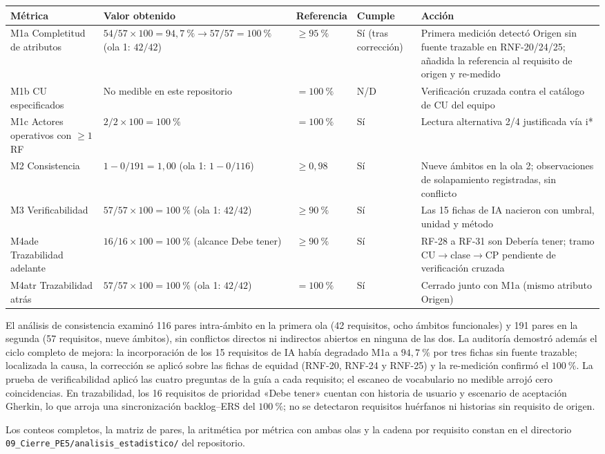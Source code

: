 \begin{center}
\begin{longtable}{|p{3.2cm}|p{2.8cm}|p{2.2cm}|p{1.5cm}|p{4.0cm}|}
\hline
\textbf{Métrica} & \textbf{Valor obtenido} & \textbf{Referencia} & \textbf{Cumple} & \textbf{Acción} \\
\hline
\endfirsthead
\hline
\endhead
M1a Completitud de atributos & $54/57 \times 100 = 94{,}7~\% \rightarrow 57/57 = 100~\%$ (ola 1: $42/42$) & $\geq 95~\%$ & Sí (tras corrección) & Primera medición detectó Origen sin fuente trazable en RNF-20/24/25; añadida la referencia al requisito de origen y re-medido \\
\hline
M1b CU especificados & No medible en este repositorio & $= 100~\%$ & N/D & Verificación cruzada contra el catálogo de CU del equipo \\
\hline
M1c Actores operativos con $\geq 1$ RF & $2/2 \times 100 = 100~\%$ & $= 100~\%$ & Sí & Lectura alternativa 2/4 justificada vía i* \\
\hline
M2 Consistencia & $1 - 0/191 = 1{,}00$ (ola 1: $1 - 0/116$) & $\geq 0{,}98$ & Sí & Nueve ámbitos en la ola 2; observaciones de solapamiento registradas, sin conflicto \\
\hline
M3 Verificabilidad & $57/57 \times 100 = 100~\%$ (ola 1: $42/42$) & $\geq 90~\%$ & Sí & Las 15 fichas de IA nacieron con umbral, unidad y método \\
\hline
M4ade Trazabilidad adelante & $16/16 \times 100 = 100~\%$ (alcance Debe tener) & $\geq 90~\%$ & Sí & RF-28 a RF-31 son Debería tener; tramo CU$\rightarrow$clase$\rightarrow$CP pendiente de verificación cruzada \\
\hline
M4atr Trazabilidad atrás & $57/57 \times 100 = 100~\%$ (ola 1: $42/42$) & $= 100~\%$ & Sí & Cerrado junto con M1a (mismo atributo Origen) \\
\hline
\end{longtable}
\label{tab:auditoria-m1-m4}
\end{center}

El análisis de consistencia examinó 116 pares intra-ámbito en la primera ola
(42 requisitos, ocho ámbitos funcionales) y 191 pares en la segunda (57
requisitos, nueve ámbitos), sin conflictos directos ni indirectos abiertos en
ninguna de las dos. La auditoría demostró además el ciclo completo de mejora:
la incorporación de los 15 requisitos de IA había degradado M1a a $94{,}7~\%$
por tres fichas sin fuente trazable; localizada la causa, la corrección se
aplicó sobre las fichas de equidad (RNF-20, RNF-24 y RNF-25) y la re-medición
confirmó el $100~\%$. La prueba de verificabilidad aplicó las cuatro preguntas
de la guía a cada requisito; el escaneo de vocabulario no medible arrojó cero
coincidencias. En trazabilidad, los 16 requisitos de prioridad «Debe tener»
cuentan con historia de usuario y escenario de aceptación Gherkin, lo que
arroja una sincronización backlog--ERS del $100~\%$; no se detectaron
requisitos huérfanos ni historias sin requisito de origen.

Los conteos completos, la matriz de pares, la aritmética por métrica con ambas
olas y la cadena por requisito constan en el directorio
\texttt{09\_Cierre\_PE5/analisis\_estadistico/} del repositorio.

